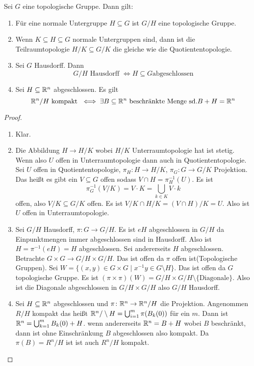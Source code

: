 \begin{Lemma}
    Sei \(G\) eine topologische Gruppe. Dann gilt:
    \begin{enumerate}
        \item Für eine normale Untergruppe \(H\subseteq G\) ist \(G/H\) eine topologische Gruppe.
        \item Wenn \(K\subseteq H\subseteq G\) normale Untergruppen sind, dann ist die 
        Teilraumtopologie \(H/K\subseteq G/K\) die gleiche wie die Quotiententopologie.
        \item Sei \(G\) Hausdorff. Dann \[G/H\text{ Hausdorff } \iff H\subseteq G \text{abgeschlossen}\] 
        \item Sei \(H\subseteq \mathbb{R}^n\) abgeschlossen. Es gilt 
        \[\mathbb{R}^n/H \text{ kompakt } \iff \exists B\subseteq \mathbb{R}^n \text{ beschränkte Menge sd.} B+H=\mathbb{R}^n\] 
    \end{enumerate}
\end{Lemma}
\begin{proof}
    \begin{enumerate}
        \item Klar.
        \item Die Abbildung \(H\to H/K\) wobei \(H/K\) Unterraumtopologie hat ist stetig.
        Wenn also \(U\) offen in Unterraumtopologie dann auch in Quotiententopologie.
        Sei \(U\) offen in Quotiententopologie, \(\pi_H\colon H\to H/K\), \(\pi_G\colon G\to G/K\) Projektion.
        Das heißt es gibt ein \(V\subseteq G\) offen sodass \(V\cap H=\pi_H^{-1}(U)\).
        Es ist \[\pi_G^{-1}(V/K)=V\cdot K=\bigcup_{k\in K}V\cdot k\] offen, also
        \(V/K\subseteq G/K\) offen.
        Es ist \(V/K \cap H/K=(V\cap H)/K=U\). 
        Also ist \(U\) offen in Unterraumtopologie.
        \item Sei \(G/H\) Hausdorff, \(\pi\colon G\to G/H\). Es ist \(eH\) abgeschlossen in \(G/H\) da Einpunktmengen immer
        abgeschlossen sind in Hausdorff. Also ist \(H=\pi^{-1}(eH)=H\) abgeschlossen.
        Sei andererseits \(H\) abgeschlossen.
        Betrachte \(G\times G\to G/H\times G/H\). Das ist offen da \(\pi\) offen ist(Topologische Gruppen).
        Sei \(W=\{(x,y)\in G\times G\mid x^{-1}y\in G\setminus H\}\). Das ist offen da \(G\) topologische Gruppe.
        Es ist \((\pi\times\pi)(W)=G/H\times G/H \setminus\{\text{Diagonale}\}\).
        Also ist die Diagonale abgeschlossen in \(G/H\times G/H\) also \(G/H\) Hausdorff.
        \item Sei \(H\subseteq \mathbb{R}^n\) abgeschlossen und \(\pi\colon \mathbb{R}^n\to \mathbb{R}^n/H\) die Projektion.
        Angenommen \(R/H\) kompakt das heißt \(\mathbb{R}^n/\setminus H=\bigcup_{i=1}^m\pi(B_k(0))\) für ein \(m\).
        Dann ist \(\mathbb{R}^n=\bigcup_{k=1}^mB_k(0)+H\).
        wenn andererseits \(\mathbb{R}^n=B+H\) wobei \(B\) beschränkt, dann ist ohne Einschränkung \(B\) abgeschlossen also kompakt.
        Da \(\pi(B)=R^n/H\) ist ist auch \(R^n/H\) kompakt.
    \end{enumerate}
\end{proof}
